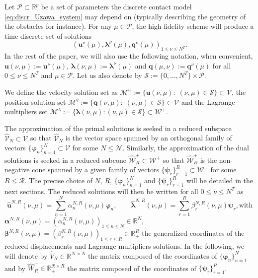 \medskip

Let $\mathcal P \subset \mathbb{R}^p$ be a set of parameters the discrete contact model \eqref{eq:discr_Uzawa_system} may depend on (typically describing the geometry of the obstacles for instance). For any $\mu \in \mathcal P$, the high-fidelity scheme will produce a time-discrete set of solutions $$\left(\mathbf{u}^{\nu}(\mu), \boldsymbol{\lambda}^{\nu}(\mu), \mathbf{q}^\nu(\mu)\right)_{1\leq \nu \leq N^T}.$$
In the rest of the paper, we will also use the following notation, when convenient, $\mathbf{u}(\nu, \mu):=\mathbf{u}^{\nu}(\mu)$,  $\boldsymbol{\lambda}(\nu, \mu):=\boldsymbol{\lambda}^{\nu}(\mu)$ and $\mathbf{q}(\mu,\nu):= \mathbf{q}^\nu(\mu)$ for all $0\leq \nu \leq N^T$ and $\mu \in \mathcal P$. Let us also denote by $\mathcal S:= \{0, \ldots, N^T\} \times \mathcal P$. 

\medskip

We define the velocity solution set as $\mathcal{M}^u:=\{\mathbf{u}(\nu,\mu):\;  (\nu, \mu)\in \mathcal S \}\subset \mathcal V$, the position solution set $\mathcal M^q:= \{\mathbf{q}(\nu,\mu):\;  (\nu, \mu)\in \mathcal S \}\subset \mathcal V$ and the Lagrange multipliers set $\mathcal{M}^{\lambda}:=\{\boldsymbol{\lambda}(\nu,\mu): (\nu, \mu)\in \mathcal S\} \subset \mathcal W^+$.

\medskip

The approximation of the primal solutions is seeked in a reduced subspace $\hat{\mathcal{V}}_N \subset \mathcal V$ so that $\hat{\mathcal{V}}_N$ is the vector space spanned by an orthogonal family of vectors $\{\boldsymbol{\varphi}_n\}_{n=1}^N\subset \mathcal V$ for some $N \leq \mathcal N$. Similarly, the approximation of the dual solutions is seeked in a reduced subcone $\hat{\mathcal{W}}_R^+ \subset \mathcal W^+$ so that $\hat{\mathcal{W}}_R^+$ is the non-negative cone spanned by a given family of vectors $\{\boldsymbol{\psi}_r\}_{r=1}^R\subset \mathcal W^+$ for some $R \leq \mathcal R$. The precise choice of $N$, $R$, $\{\boldsymbol{\varphi}_n\}_{n=1}^N$ and $\{\boldsymbol{\psi}_r\}_{r=1}^R$ will be detailed in the next sections. 
The reduced solutions will then be written for all $0\leq \nu \leq N^T$ as 
\begin{equation*}
\displaystyle \hat{\mathbf{u}}^{N,R}(\nu, \mu) = \sum_{n=1}^N \alpha^{N,R}_n(\nu, \mu) \boldsymbol{\varphi}_n, \qquad
\displaystyle \hat{\boldsymbol{\lambda}}^{N,R}(\nu, \mu) = \sum_{r=1}^R \beta^{N,R}_r(\nu, \mu) \boldsymbol{\psi}_r, 
\text{with}
\end{equation*}
$\boldsymbol{\alpha}^{N,R}(\nu, \mu) = \left(\alpha^{N,R}_n(\nu,\mu)\right)_{1\leq n \leq N} \in \mathbb{R}^N$, $\boldsymbol{\beta}^{N,R}(\nu,\mu) = \left(\beta^{N,R}_r(\nu, \mu)\right)_{1\leq r \leq R} \in \mathbb{R}_+^R$
the generalized coordinates of the reduced displacements and Lagrange multipliers solutions. In the following, we will denote by $\hat{V}_N \in \mathbb{R}^{\mathcal N\times N}$ the matrix composed of the coordinates of $\{\boldsymbol{\varphi}_n\}_{n=1}^N$ and by $\hat{W}_R^+\in \mathbb{R}_+^{\mathcal R\times R}$ the matrix composed of the coordinates of $\{\boldsymbol{\psi}_r\}_{r=1}^R$.
 
